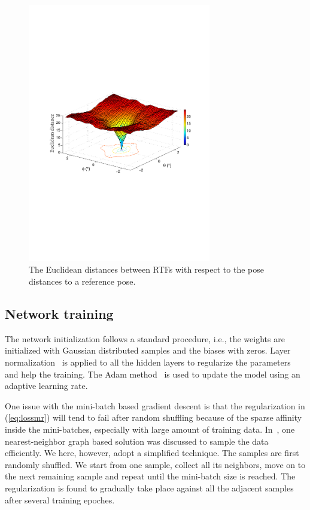 \documentclass{article}
\begin{document}
\begin{figure}[tb]
    \centering
    \centerline{\includegraphics[width=8.0cm]{fig2_euc.pdf}}
    \caption{The Euclidean distances between RTFs with respect to the pose distances to a reference pose.}
    \label{fig2}
\end{figure}

\subsection{Network training}


The network initialization follows a standard procedure, i.e., the weights are initialized with Gaussian distributed samples and the biases with zeros. Layer normalization~\cite{ba2016layer} is applied to all the hidden layers to regularize the parameters and help the training. The Adam method~\cite{kingma2014adam} is used to update the model using an adaptive learning rate.

One issue with the mini-batch based gradient descent is that the regularization in (\ref{eq:lossmr}) will tend to fail after random shuffling because of the sparse affinity inside the mini-batches, especially with large amount of training data. In~\cite{th2017acoustic}, one nearest-neighbor graph based solution was discussed to sample the data efficiently. We here, however, adopt a simplified technique. The samples are first randomly shuffled. We start from one sample, collect all its neighbors, move on to the next remaining sample and repeat until the mini-batch size is reached. The regularization is found to gradually take place against all the adjacent samples after several training epoches.
\end{document}
